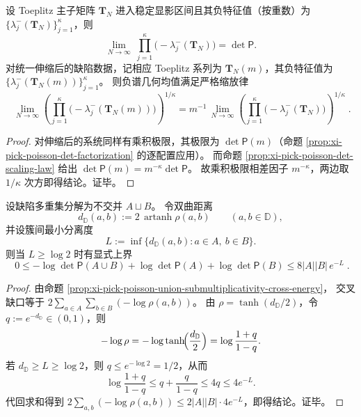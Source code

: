 \begin{conclusion}\label{con:xi-terminal-toeplitz-negative-geometric-mean-homothety}
设 Toeplitz 主子矩阵 \(\mathbf{T}_N\) 进入稳定显影区间且其负特征值（按重数）为 \(\{\lambda_j^{-}(\mathbf{T}_N)\}_{j=1}^{\kappa}\)，则
\[
\lim_{N\to\infty}\ \prod_{j=1}^{\kappa}\bigl(-\lambda_j^{-}(\mathbf{T}_N)\bigr)=\det\mathsf P.
\]
对统一伸缩后的缺陷数据，记相应 Toeplitz 系列为 \(\mathbf{T}_N(m)\)，其负特征值为 \(\{\lambda_j^{-}(\mathbf{T}_N(m))\}_{j=1}^{\kappa}\)。
则负谱几何均值满足严格缩放律
\[
\boxed{\;
\lim_{N\to\infty}\left(\prod_{j=1}^{\kappa}\bigl(-\lambda_j^{-}(\mathbf{T}_N(m))\bigr)\right)^{1/\kappa}
=m^{-1}\,
\lim_{N\to\infty}\left(\prod_{j=1}^{\kappa}\bigl(-\lambda_j^{-}(\mathbf{T}_N)\bigr)\right)^{1/\kappa}\; } .
\]
\end{conclusion}
\begin{proof}
对伸缩后的系统同样有乘积极限，其极限为 \(\det\mathsf P(m)\)（命题 \ref{prop:xi-pick-poisson-det-factorization} 的逐配置应用）。
而命题 \ref{prop:xi-pick-poisson-det-scaling-law} 给出 \(\det\mathsf P(m)=m^{-\kappa}\det\mathsf P\)。
故乘积极限相差因子 \(m^{-\kappa}\)，两边取 \(1/\kappa\) 次方即得结论。证毕。
\end{proof}

\begin{proposition}[簇分离下交叉互能的显式指数上界]\label{prop:xi-pick-poisson-cross-energy-exp-bound}
设缺陷多重集分解为不交并 \(A\sqcup B\)。
令双曲距离
\[
d_{\mathbb{D}}(a,b):=2\,\operatorname{artanh}\rho(a,b)\qquad(a,b\in\mathbb D),
\]
并设簇间最小分离度
\[
L:=\inf\{d_{\mathbb D}(a,b):a\in A,\ b\in B\}.
\]
则当 \(L\ge \log 2\) 时有显式上界
\[
\boxed{\;
0\le -\log\det\mathsf P(A\cup B)+\log\det\mathsf P(A)+\log\det\mathsf P(B)
\le 8|A||B|\,e^{-L}\; } .
\]
\end{proposition}
\begin{proof}
由命题 \ref{prop:xi-pick-poisson-union-submultiplicativity-cross-energy}，
交叉缺口等于
\(
2\sum_{a\in A}\sum_{b\in B}(-\log\rho(a,b))
\)。
由 \(\rho=\tanh(d_{\mathbb D}/2)\)，令 \(q:=e^{-d_{\mathbb D}}\in(0,1)\)，则
\[
-\log\rho=-\log\tanh\!\Bigl(\frac{d_{\mathbb D}}{2}\Bigr)=\log\frac{1+q}{1-q}.
\]
若 \(d_{\mathbb D}\ge L\ge\log 2\)，则 \(q\le e^{-\log2}=1/2\)，从而
\[
\log\frac{1+q}{1-q}\le q+\frac{q}{1-q}\le 4q\le 4e^{-L}.
\]
代回求和得到
\(
2\sum_{a,b}(-\log\rho(a,b))\le 2|A||B|\cdot 4e^{-L}
\)，即得结论。证毕。
\end{proof}

